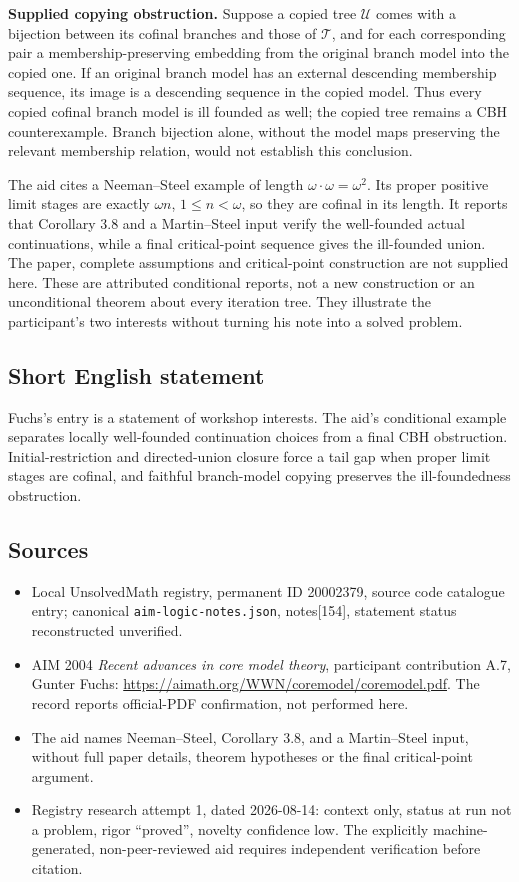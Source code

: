 \documentclass[11pt]{article}
\begin{document}
\textbf{Supplied copying obstruction.} Suppose a copied tree $\mathcal U$ comes with a bijection between its cofinal branches and those of $\mathcal T$, and for each corresponding pair a membership-preserving embedding from the original branch model into the copied one. If an original branch model has an external descending membership sequence, its image is a descending sequence in the copied model. Thus every copied cofinal branch model is ill founded as well; the copied tree remains a CBH counterexample. Branch bijection alone, without the model maps preserving the relevant membership relation, would not establish this conclusion.

The aid cites a Neeman--Steel example of length $\omega\cdot\omega=\omega^2$. Its proper positive limit stages are exactly $\omega n$, $1\le n<\omega$, so they are cofinal in its length. It reports that Corollary 3.8 and a Martin--Steel input verify the well-founded actual continuations, while a final critical-point sequence gives the ill-founded union. The paper, complete assumptions and critical-point construction are not supplied here. These are attributed conditional reports, not a new construction or an unconditional theorem about every iteration tree. They illustrate the participant's two interests without turning his note into a solved problem.
\subsection{Short English statement}
Fuchs's entry is a statement of workshop interests. The aid's conditional example separates locally well-founded continuation choices from a final CBH obstruction. Initial-restriction and directed-union closure force a tail gap when proper limit stages are cofinal, and faithful branch-model copying preserves the ill-foundedness obstruction.
\subsection{Sources}
\begin{itemize}
\item Local UnsolvedMath registry, permanent ID 20002379, source code catalogue entry; canonical \texttt{aim-logic-notes.json}, notes[154], statement status reconstructed unverified.
\item AIM 2004 \emph{Recent advances in core model theory}, participant contribution A.7, Gunter Fuchs: \url{https://aimath.org/WWN/coremodel/coremodel.pdf}. The record reports official-PDF confirmation, not performed here.
\item The aid names Neeman--Steel, Corollary 3.8, and a Martin--Steel input, without full paper details, theorem hypotheses or the final critical-point argument.
\item Registry research attempt 1, dated 2026-08-14: context only, status at run not a problem, rigor ``proved'', novelty confidence low. The explicitly machine-generated, non-peer-reviewed aid requires independent verification before citation.
\end{itemize}
\end{document}
